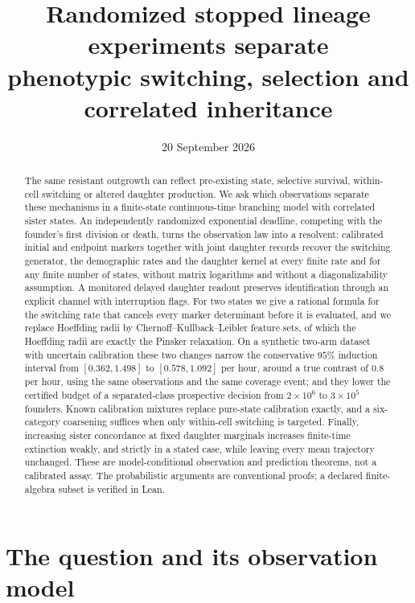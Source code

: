 \documentclass[11pt]{article}
\title{Randomized stopped lineage experiments separate\\
phenotypic switching, selection and correlated inheritance}
\author{}
\date{20 September 2026}
\theoremstyle{definition}
\begin{document}
\maketitle

\begin{abstract}
The same resistant outgrowth can reflect pre-existing state, selective survival,
within-cell switching or altered daughter production. We ask which observations
separate these mechanisms in a finite-state continuous-time branching model with
correlated sister states. An independently randomized exponential deadline,
competing with the founder's first division or death, turns the observation law
into a resolvent: calibrated initial and endpoint markers together with joint
daughter records recover the switching generator, the demographic rates and the
daughter kernel at every finite rate and for any finite number of states,
without matrix logarithms and without a diagonalizability assumption. A
monitored delayed daughter readout preserves identification through an explicit
channel with interruption flags. For two states we give a rational formula for
the switching rate that cancels every marker determinant before it is evaluated,
and we replace Hoeffding radii by Chernoff--Kullback--Leibler feature sets, of
which the Hoeffding radii are exactly the Pinsker relaxation. On a synthetic
two-arm dataset with uncertain calibration these two changes narrow the
conservative $95\%$ induction interval from $[0.362,1.498]$ to $[0.578,1.092]$
per hour, around a true contrast of $0.8$ per hour, using the same observations
and the same coverage event; and they lower the certified budget of a
separated-class prospective decision from $2\times10^{6}$ to $3\times10^{5}$
founders. Known calibration mixtures replace pure-state calibration exactly, and
a six-category coarsening suffices when only within-cell switching is targeted.
Finally, increasing sister concordance at fixed daughter marginals increases
finite-time extinction weakly, and strictly in a stated case, while leaving
every mean trajectory unchanged. These are model-conditional observation and
prediction theorems, not a calibrated assay. The probabilistic arguments are
conventional proofs; a declared finite-algebra subset is verified in Lean.
\end{abstract}

\section{The question and its observation model}
\end{document}
